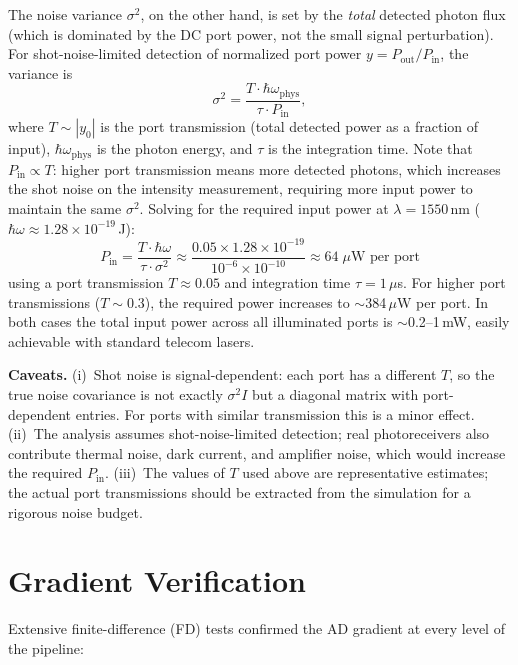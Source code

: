 \documentclass[11pt,a4paper]{article}
\begin{document}
The noise variance $\sigma^2$, on the other hand, is set by the \emph{total} detected photon flux (which is dominated by the DC port power, not the small signal perturbation).  For shot-noise-limited detection of normalized port power $y = P_{\text{out}}/P_{\text{in}}$, the variance is
\[
  \sigma^2 = \frac{T \cdot \hbar\omega_{\text{phys}}}{\tau \cdot P_{\text{in}}},
\]
where $T \sim |y_0|$ is the port transmission (total detected power as a fraction of input), $\hbar\omega_{\text{phys}}$ is the photon energy, and $\tau$ is the integration time.  Note that $P_{\text{in}} \propto T$: higher port transmission means more detected photons, which increases the shot noise on the intensity measurement, requiring more input power to maintain the same $\sigma^2$.  Solving for the required input power at $\lambda = 1550$\,nm ($\hbar\omega \approx 1.28 \times 10^{-19}$\,J):
\[
  P_{\text{in}} = \frac{T \cdot \hbar\omega}{\tau \cdot \sigma^2}
  \approx \frac{0.05 \times 1.28 \times 10^{-19}}{10^{-6} \times 10^{-10}}
  \approx 64\;\mu\text{W per port}
\]
using a port transmission $T \approx 0.05$ and integration time $\tau = 1\,\mu$s.  For higher port transmissions ($T \sim 0.3$), the required power increases to $\sim$384\,$\mu$W per port.  In both cases the total input power across all illuminated ports is $\sim$0.2--1\,mW, easily achievable with standard telecom lasers.

\textbf{Caveats.}  (i)~Shot noise is signal-dependent: each port has a different $T$, so the true noise covariance is not exactly $\sigma^2 I$ but a diagonal matrix with port-dependent entries.  For ports with similar transmission this is a minor effect.  (ii)~The analysis assumes shot-noise-limited detection; real photoreceivers also contribute thermal noise, dark current, and amplifier noise, which would increase the required $P_{\text{in}}$.  (iii)~The values of $T$ used above are representative estimates; the actual port transmissions should be extracted from the simulation for a rigorous noise budget.

\section{Gradient Verification}

Extensive finite-difference (FD) tests confirmed the AD gradient at every level of the pipeline:
\end{document}

